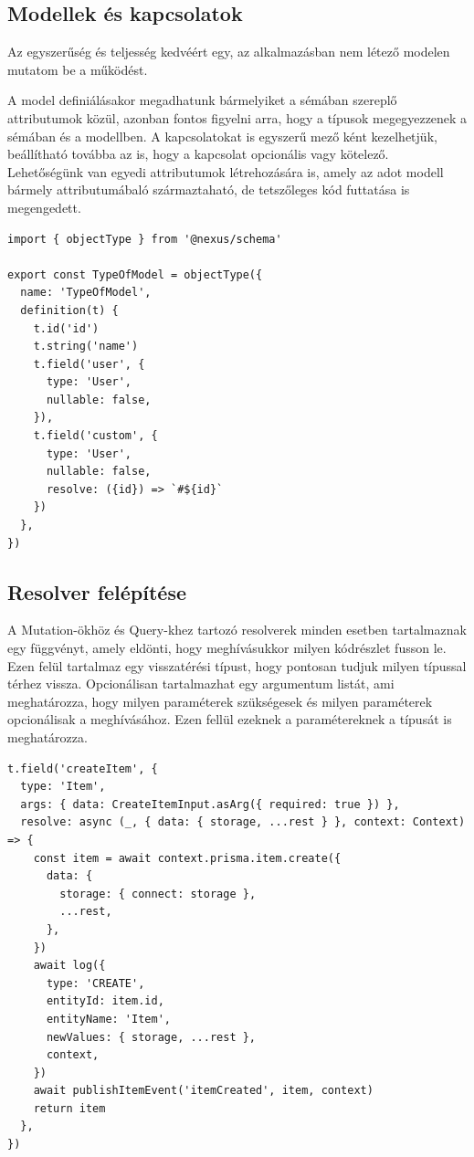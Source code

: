 \subsection{Modellek és kapcsolatok}
Az egyszerűség és teljesség kedvéért egy, az alkalmazásban nem létező modelen mutatom be a működést.

A model definiálásakor megadhatunk bármelyiket a sémában szereplő attributumok közül, azonban fontos figyelni arra, hogy a típusok megegyezzenek a sémában és a modellben.
A kapcsolatokat is egyszerű mező ként kezelhetjük, beállítható továbba az is, hogy a kapcsolat opcionális vagy kötelező.
Lehetőségünk van egyedi attributumok létrehozására is, amely az adot modell bármely attributumábaló származtaható, de tetszőleges kód futtatása is megengedett.

\begin{lstlisting}[style=ES6, caption={Példa model}]
import { objectType } from '@nexus/schema'

export const TypeOfModel = objectType({
  name: 'TypeOfModel',
  definition(t) {
    t.id('id')
    t.string('name')
    t.field('user', {
      type: 'User',
      nullable: false,
    }),
    t.field('custom', {
      type: 'User',
      nullable: false,
      resolve: ({id}) => `#${id}`
    })
  },
})
\end{lstlisting}

\subsection{Resolver felépítése}
A Mutation-ökhöz és Query-khez tartozó resolverek minden esetben tartalmaznak egy függvényt, amely eldönti, hogy meghívásukkor milyen kódrészlet fusson le.
Ezen felül tartalmaz egy visszatérési típust, hogy pontosan tudjuk milyen típussal térhez vissza.
Opcionálisan tartalmazhat egy argumentum listát, ami meghatározza, hogy milyen paraméterek szükségesek és milyen paraméterek opcionálisak a meghívásához.
Ezen fellül ezeknek a paramétereknek a típusát is meghatározza. 
\begin{lstlisting}[style=ES6, caption={Eszköz létrehozás resolver}]
t.field('createItem', {
  type: 'Item',
  args: { data: CreateItemInput.asArg({ required: true }) },
  resolve: async (_, { data: { storage, ...rest } }, context: Context) => {
    const item = await context.prisma.item.create({
      data: {
        storage: { connect: storage },
        ...rest,
      },
    })
    await log({
      type: 'CREATE',
      entityId: item.id,
      entityName: 'Item',
      newValues: { storage, ...rest },
      context,
    })
    await publishItemEvent('itemCreated', item, context)
    return item
  },
})
\end{lstlisting}

